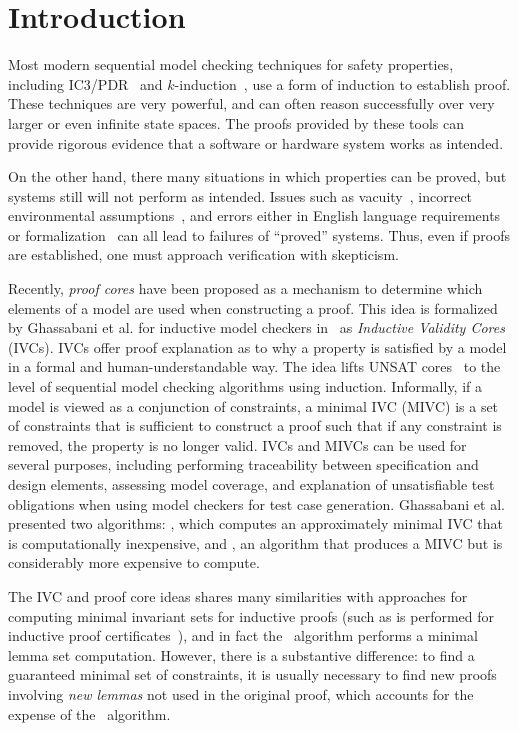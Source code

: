 \section{Introduction}
\label{sec:intro}
Most modern sequential model checking techniques for safety properties, including IC3/PDR~\cite{Een2011:PDR} and $k$-induction~\cite{SheeranSS00}, use a form of induction to establish proof.  These techniques are very powerful, and can often reason successfully over very larger or even infinite state spaces.  The proofs provided by these tools can provide rigorous evidence that a software or hardware system works as intended.

On the other hand, there many situations in which properties can be proved, but systems still will not perform as intended.  Issues such as vacuity~\cite{Kupferman03:Vacuity}, incorrect environmental assumptions~\cite{Whalen07:FMICS}, and errors either in English language requirements or formalization~\cite{Pike06:axioms} can all lead to failures of ``proved'' systems.  Thus, even if proofs are established, one must approach verification with skepticism.

Recently, {\em proof cores} have been proposed as a mechanism to determine which elements of a model are used when constructing a proof.  This idea is formalized by Ghassabani et al. for inductive model checkers in~\cite{Ghass16} as {\em Inductive Validity Cores} (IVCs). IVCs offer proof explanation as to why a property is satisfied by a model in a formal and human-understandable way.  The idea lifts UNSAT cores~\cite{zhang2003extracting}
to the level of sequential model checking algorithms using induction.  Informally, if a model is viewed as a conjunction of constraints,
a minimal IVC (MIVC) is a set of constraints that is sufficient to construct a proof such that if any constraint is removed, the property is no longer valid.
%
IVCs and MIVCs can be used for several purposes, including performing traceability between specification and design elements, assessing model coverage, and explanation of unsatisfiable test obligations when using model checkers for test case generation. Ghassabani et al.~\cite{Ghass16} presented two algorithms: \ucalg, which computes an approximately minimal IVC that is computationally inexpensive, and \ucbfalg,
an algorithm that produces a
MIVC but is considerably more expensive to compute.

The IVC and proof core ideas shares many similarities with approaches for computing minimal invariant sets for inductive proofs (such as is performed for inductive proof certificates~\cite{piskac2016, ivrii2014small}), and in fact the \ucalg\ algorithm performs a minimal lemma set computation.  However, there is a substantive difference: to find a guaranteed minimal set of constraints, it is usually necessary to find new proofs involving {\em new lemmas} not used in the original proof, which accounts for the expense of the \ucbfalg\ algorithm.

